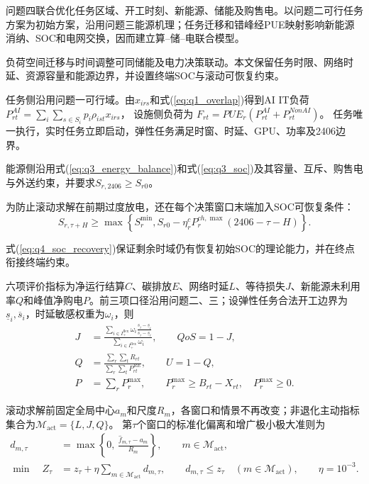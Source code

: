问题四联合优化任务区域、开工时刻、新能源、储能及购售电。以问题二可行任务方案为初始方案，沿用问题三能源机理；任务迁移和错峰经PUE映射影响新能源消纳、SOC和电网交换，因而建立算--储--电联合模型。

负荷空间迁移与时间调整可同储能及电力决策联动\cite{ref9}。本文保留任务时限、网络时延、资源容量和能源边界，并设置终端SOC与滚动可恢复约束。

任务侧沿用问题一可行域。由$x_{irs}$和式(\ref{eq:q1_overlap})得到AI IT负荷
$P_{rt}^{AI}=\sum_i\sum_{s\in S_i}p_i\rho_{ist}x_{irs}$，
设施侧负荷为
$F_{rt}=PUE_r(P_{rt}^{AI}+P_{rt}^{NonAI})$。
任务唯一执行，实时任务立即启动，弹性任务满足时窗、时延、GPU、功率及2406边界。

能源侧沿用式(\ref{eq:q3_energy_balance})和式(\ref{eq:q3_soc})及其容量、互斥、购售电与外送约束，并要求$S_{r,2406}\geq S_{r0}$。

为防止滚动求解在前期过度放电，还在每个决策窗口末端加入SOC可恢复条件：
\begin{equation}
	S_{r,\tau+H}
	\geq
	\max\left\{
	S_r^{\min},
	S_{r0}-
	\eta_r^cP_r^{ch,\max}(2406-\tau-H)
	\right\}.
	\label{eq:q4_soc_recovery}
\end{equation}

式(\ref{eq:q4_soc_recovery})保证剩余时域仍有恢复初始SOC的理论能力，并在终点衔接终端约束。

六项评价指标为净运行结算$C$、碳排放$E$、网络时延$L$、等待损失$J$、新能源未利用率$Q$和峰值净购电$P$。前三项口径沿用问题二、三；设弹性任务合法开工边界为$\underline{s}_i,\overline{s}_i$，时延敏感权重为$\omega_i$，则
\begin{equation}
	\begin{aligned}
		J&=
		\frac{
			\displaystyle\sum_{i\in I^{\mathrm{flex}}_+}
			\omega_i
			\frac{s_i-\underline{s}_i}
			{\overline{s}_i-\underline{s}_i}}
		{\displaystyle\sum_{i\in I^{\mathrm{flex}}_+}\omega_i},
		\qquad QoS=1-J,\\
		Q&=
		\frac{\displaystyle\sum_r\sum_tR_{rt}}
		{\displaystyle\sum_r\sum_tP^{RE}_{rt}},
		\qquad U=1-Q,\\
		P&=\sum_rP_r^{\max},
		\qquad
		P_r^{\max}\geq B_{rt}-X_{rt},
		\quad P_r^{\max}\geq0.
	\end{aligned}
	\label{eq:q4_metrics}
\end{equation}

滚动求解前固定全局中心$a_m$和尺度$R_m$，各窗口和情景不再改变；非退化主动指标集合为$\mathcal M_{\mathrm{act}}=\{L,J,Q\}$。
第$\tau$个窗口的标准化偏离和增广极小极大准则为
\begin{equation}
	\begin{aligned}
		d_{m,\tau}
		&=
		\max\left\{
		0,\,
		\frac{\hat f_{m,\tau}-a_m}{R_m}
		\right\},
		\qquad m\in\mathcal M_{\mathrm{act}},\\
		\min\quad Z_\tau
		&=
		z_\tau+\eta\sum_{m\in\mathcal M_{\mathrm{act}}} d_{m,\tau},
		\qquad
		d_{m,\tau}\leq z_\tau\quad(m\in\mathcal M_{\mathrm{act}}),
		\qquad
		\eta=10^{-3}.
	\end{aligned}
	\label{eq:q4_minmax}
\end{equation}

